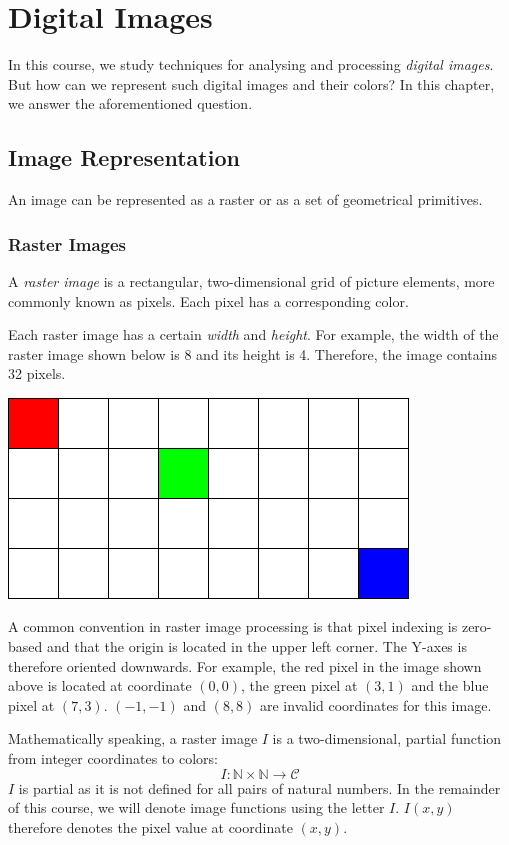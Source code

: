 \documentclass{book}
\begin{document}
\chapter{Digital Images}
In this course, we study techniques for analysing and processing \emph{digital images}. But how can we represent such digital images and their colors? In this chapter, we answer the aforementioned question.

\section{Image Representation}
An image can be represented as a raster or as a set of geometrical primitives.

\subsection{Raster Images}
A \emph{raster image} is a rectangular, two-dimensional grid of picture elements, more commonly known as pixels. Each pixel has a corresponding color.

Each raster image has a certain \emph{width} and \emph{height}. For example, the width of the raster image shown below is 8 and its height is 4. Therefore, the image contains 32 pixels.
\begin{center}
\includegraphics[scale=0.35]{rasterimage.png}
\end{center}
A common convention in raster image processing is that pixel indexing is zero-based and that the origin is located in the upper left corner. The Y-axes is therefore oriented downwards. For example, the red pixel in the image shown above is located at coordinate $(0, 0)$, the green pixel at $(3, 1)$ and the blue pixel at $(7, 3)$. $(-1, -1)$ and $(8, 8)$ are invalid coordinates for this image.

Mathematically speaking, a raster image $I$ is a two-dimensional, partial function from integer coordinates to colors:
$$I: \mathbb{N} \times \mathbb{N} \rightarrow \mathcal{C}$$
$I$ is partial as it is not defined for all pairs of natural numbers. In the remainder of this course, we will denote image functions using the letter $I$. $I(x, y)$ therefore denotes the pixel value at coordinate $(x, y)$.
\end{document}
